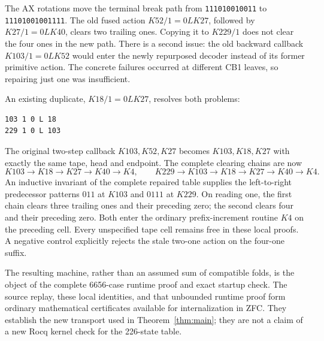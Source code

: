 The AX rotations move the terminal break path from
\texttt{111010010011} to \texttt{11101001001111}.
The old fused action $K52/1=0LK27$, followed by $K27/1=0LK40$,
clears two trailing ones.  Copying it to $K229/1$ does not clear
the four ones in the new path.  There is a second issue: the old
backward callback $K103/1=0LK52$ would enter the newly repurposed
decoder instead of its former primitive action.  The concrete failures
occurred at different CB1 leaves, so repairing just one was insufficient.

An existing duplicate, $K18/1=0LK27$, resolves both problems:
\begin{verbatim}
103 1 0 L 18
229 1 0 L 103
\end{verbatim}
The original two-step callback $K103,K52,K27$ becomes
$K103,K18,K27$ with exactly the same tape, head and endpoint.
The complete clearing chains are now
\[
 K103\to K18\to K27\to K40\to K4,
 \qquad
 K229\to K103\to K18\to K27\to K40\to K4.
\]
An inductive invariant of the complete repaired table supplies the
left-to-right predecessor patterns $011$ at $K103$ and $0111$ at
$K229$.  On reading one, the first chain clears three trailing ones
and their preceding zero; the second clears four and their preceding
zero.  Both enter the ordinary prefix-increment routine $K4$ on the
preceding cell.  Every unspecified tape cell remains free in these
local proofs.  A negative control explicitly rejects the stale
two-one action on the four-one suffix.

The resulting machine, rather than an assumed sum of compatible folds,
is the object of the complete 6656-case runtime proof and exact startup
check.  The source replay, these local identities, and that unbounded
runtime proof form ordinary mathematical certificates available for
internalization in ZFC.  They establish the new transport used in
Theorem~\ref{thm:main}; they are not a claim of a new Rocq kernel check
for the 226-state table.
